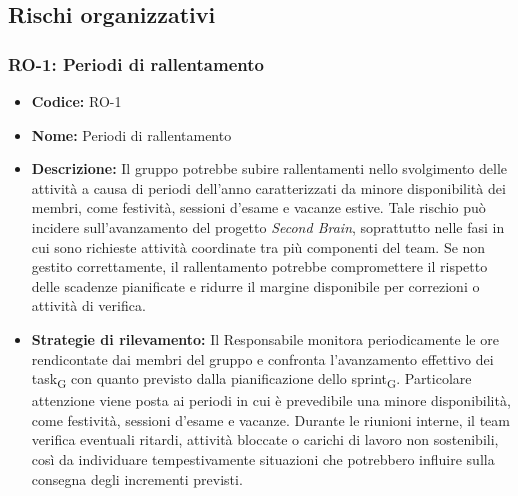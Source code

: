 \documentclass[a4paper, 10pt, colorlinks=true, linkcolor=black, urlcolor=blue, citecolor=blue, hidelinks]{article}
\begin{document}
\subsection{Rischi organizzativi}

\subsubsection{RO-1: Periodi di rallentamento}

\begin{itemize}
    \item \textbf{Codice:} RO-1

    \item \textbf{Nome:} Periodi di rallentamento

    \item \textbf{Descrizione:} Il gruppo potrebbe subire rallentamenti nello svolgimento delle attività a causa di periodi dell'anno caratterizzati da minore disponibilità dei membri, come festività, sessioni d'esame e vacanze estive. Tale rischio può incidere sull'avanzamento del progetto \textit{Second Brain}, soprattutto nelle fasi in cui sono richieste attività coordinate tra più componenti del team. Se non gestito correttamente, il rallentamento potrebbe compromettere il rispetto delle scadenze pianificate e ridurre il margine disponibile per correzioni o attività di verifica.

    \item \textbf{Strategie di rilevamento:} Il Responsabile monitora periodicamente le ore rendicontate dai membri del gruppo e confronta l'avanzamento effettivo dei task\textsubscript{G} con quanto previsto dalla pianificazione dello sprint\textsubscript{G}. Particolare attenzione viene posta ai periodi in cui è prevedibile una minore disponibilità, come festività, sessioni d'esame e vacanze. Durante le riunioni interne, il team verifica eventuali ritardi, attività bloccate o carichi di lavoro non sostenibili, così da individuare tempestivamente situazioni che potrebbero influire sulla consegna degli incrementi previsti.


\end{itemize}
\end{document}

